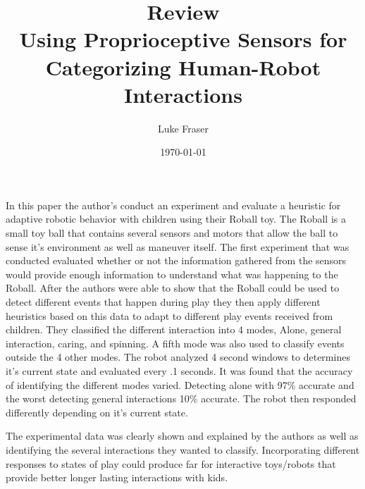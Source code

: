 \documentclass{article}
\begin{document}
\title{{\large Review} \\ Using Proprioceptive Sensors for Categorizing Human-Robot Interactions}
\author{Luke Fraser}
\date{\today}
\maketitle

\begingroup
\renewcommand{\section}[2]{}


\endgroup

\section*{Summary}
In this paper the author's conduct an experiment and evaluate a heuristic for adaptive robotic behavior with children using their Roball toy. The Roball is a small toy ball that contains several sensors and motors that allow the ball to sense it's environment as well as maneuver itself. The first experiment that was conducted evaluated whether or not the information gathered from the sensors would provide enough information to understand what was happening to the Roball. After the authors were able to show that the Roball could be used to detect different events that happen during play they then apply different heuristics based on this data to adapt to different play events received from children. They classified the different interaction into 4 modes, Alone, general interaction, caring, and spinning. A fifth mode was also used to classify events outside the 4 other modes. The robot analyzed 4 second windows to determines it's current state and evaluated every .1 seconds. It was found that the accuracy of identifying the different modes varied. Detecting alone with 97\% accurate and the worst detecting general interactions 10\% accurate. The robot then responded differently depending on it's current state.
\section*{Strengths}
The experimental data was clearly shown and explained by the authors as well as identifying the several interactions they wanted to classify. Incorporating different responses to states of play could produce far for interactive toys/robots that provide better longer lasting interactions with kids.
\end{document}

